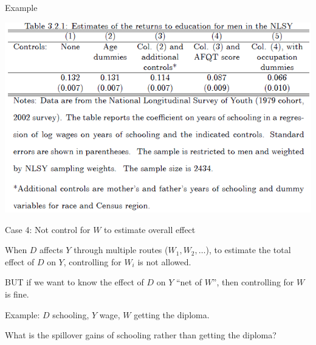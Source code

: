\documentclass[handout]{beamer}
\begin{document}
\begin{frame}{Example}
	\begin{center}
		\includegraphics[width=.9\textwidth]{./Figures/2-ovb.png}
	\end{center}
\end{frame}

\begin{frame}{Case 4: Not control for $W$ to estimate overall effect}
\begin{center}
\qquad
{}
\end{center}
When $D$ affects $Y$ through multiple routes ($W_1,W_2,\dots$), to estimate the total effect of $D$ on $Y$, controlling for $W_i$ is not allowed.\medskip 

BUT if we want to know the effect of $D$ on $Y$ ``net of $W$'', then controlling for $W$ is fine.\medskip

Example: $D$ schooling, $Y$ wage, $W$ getting the diploma.\medskip

What is the spillover gains of schooling rather than getting the diploma? 
\end{frame}
\end{document}
